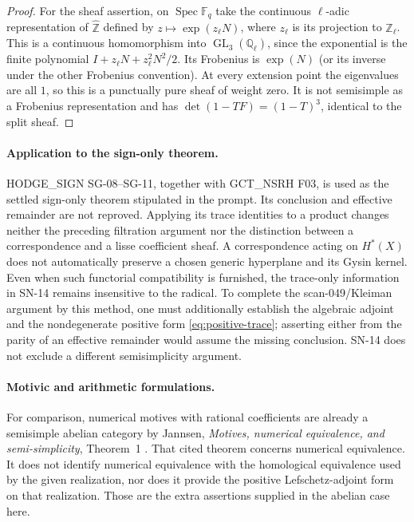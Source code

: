 \documentclass[11pt,a4paper]{article}
\theoremstyle{definition}
\theoremstyle{remark}
\begin{document}
\begin{proof}
For the sheaf assertion, on $\operatorname{Spec}\mathbb F_q$ take the
continuous $\ell$-adic representation of $\widehat{\mathbb Z}$ defined by
$z\mapsto\exp(z_\ell N)$, where $z_\ell$ is its projection to
$\mathbb Z_\ell$.  This is a continuous homomorphism into
$\operatorname{GL}_3(\mathbb Q_\ell)$, since the exponential is the finite
polynomial $I+z_\ell N+z_\ell^2N^2/2$.
Its Frobenius is $\exp(N)$ (or its inverse under the other
Frobenius convention).  At every extension point the eigenvalues are all
$1$, so this is a punctually pure sheaf of weight zero.  It is not
semisimple as a Frobenius representation and has
$\det(1-TF)=(1-T)^3$, identical to the split sheaf.
\end{proof}

\paragraph{Application to the sign-only theorem.}
HODGE\_SIGN SG-08--SG-11, together with GCT\_NSRH F03, is used as the
settled sign-only theorem stipulated in the prompt.  Its conclusion and
effective remainder are not reproved.  Applying its trace identities to
a product changes neither the preceding filtration argument nor the
distinction between a correspondence and a lisse coefficient sheaf.
A correspondence acting on $H^*(X)$ does not automatically preserve a
chosen generic hyperplane and its Gysin kernel.  Even when such
functorial compatibility is furnished, the trace-only information in
SN-14 remains insensitive to the radical.  To complete the
scan-049/Kleiman argument by this method, one must additionally establish
the algebraic adjoint and the nondegenerate positive form
\eqref{eq:positive-trace}; asserting either from the parity of an
effective remainder would assume the missing conclusion.  SN-14 does
not exclude a different semisimplicity argument.

\paragraph{Motivic and arithmetic formulations.}
For comparison, numerical motives with rational coefficients are already
a semisimple abelian category by Jannsen,
\emph{Motives, numerical equivalence, and semi-simplicity},
Theorem~1 \cite{Jannsen1992}.  That cited theorem concerns numerical
equivalence.  It does not identify numerical equivalence with the
homological equivalence used by the given realization, nor does it
provide the positive Lefschetz-adjoint form on that realization.
Those are the extra assertions supplied in the abelian case here.
\end{document}

